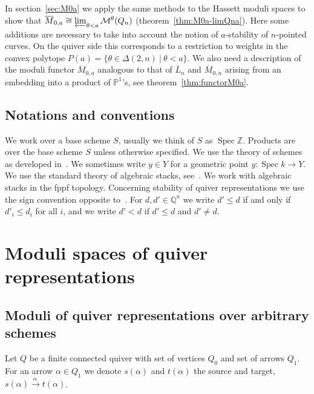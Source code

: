 \documentclass[ALCO,ThmDefs,Unicode,epreuves]{cedram}
\def\Z{\mathds Z}
\def\Q{\mathds Q}
\def\P{\mathds P}
\DeclareMathOperator{\Spec}{Spec}
\begin{document}

In section~\ref{sec:M0a} we apply the same methods to the Hassett moduli spaces 
to show that $\overline{M}_{0,a}\cong\varprojlim_{\theta<a}\mathcal M^\theta(Q_n)$
(theorem~\ref{thm:M0a-limQna}). Here some additions are necessary to take into 
account the notion of $a$-stability of $n$-pointed curves.
On the quiver side this corresponds to a restriction to weights in the convex
polytope %
$P(a)=\{\theta\in\Delta(2,n)\:|\:\theta<a\}$.
We also need a description of the moduli functor $\overline{M}_{0,a}$
analogous to that of $\overline{L}_n$ and $\overline{M}_{0,n}$ arising from 
an embedding into a product of $\P^1$'s, see theorem~\ref{thm:functorM0a}.


\subsection*{Notations and conventions}
We work over a base scheme $S$, usually we think of $S$ as $\Spec\Z$.
Products are over the base scheme $S$ unless otherwise specified. 
We use the theory of schemes as developed in~\cite{EGA, EGA1}. 
We sometimes write $y\in Y$ for a geometric point $y\colon\Spec k\to Y$.
We use the standard theory of algebraic stacks, see~\cite{SP}. 
We work with algebraic stacks in the fppf topology.
Concerning stability of quiver representations we use the sign convention 
opposite to~\cite{Ki94}. For $d,d'\in\Q^n$ we write $d'\leq d$ if and only if 
$d'_i\leq d_i$ for all $i$, and we write $d'<d$ if $d'\leq d$ and $d'\neq d$.



\section{Moduli spaces of quiver representations}
\label{sec:moduliquiver}

\subsection{Moduli of quiver representations over arbitrary schemes}

Let $Q$ be a finite connected quiver with set of vertices $Q_0$ and
set of arrows $Q_1$. 
For an arrow $\alpha\in Q_1$ we denote $s(\alpha)$ and $t(\alpha)$ the source
and target, \ie $s(\alpha)\stackrel{\alpha\:}{\longrightarrow}t(\alpha)$.
\end{document}
